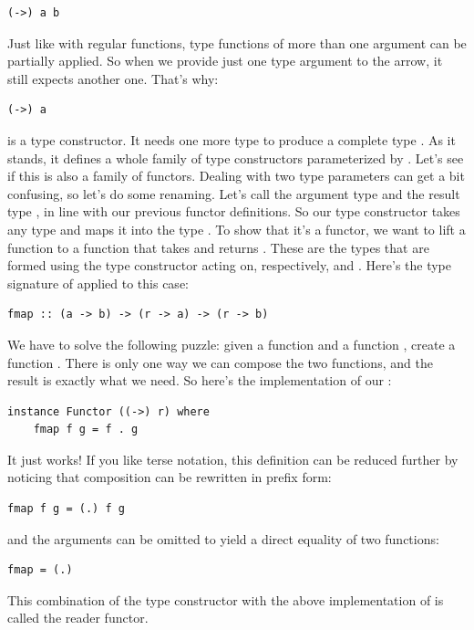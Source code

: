 \begin{verbatim}
(->) a b
\end{verbatim}
Just like with regular functions, type functions of more than one
argument can be partially applied. So when we provide just one type
argument to the arrow, it still expects another one. That's why:

\begin{verbatim}
(->) a
\end{verbatim}
is a type constructor. It needs one more type  to produce a
complete type . As it stands, it defines a
whole family of type constructors parameterized by . Let's see
if this is also a family of functors. Dealing with two type parameters
can get a bit confusing, so let's do some renaming. Let's call the
argument type  and the result type , in line with
our previous functor definitions. So our type constructor takes any type
 and maps it into the type . To show
that it's a functor, we want to lift a function
 to a function that takes
 and returns . These
are the types that are formed using the type constructor
 acting on, respectively,  and
. Here's the type signature of  applied to this
case:

\begin{verbatim}
fmap :: (a -> b) -> (r -> a) -> (r -> b)
\end{verbatim}
We have to solve the following puzzle: given a function
 and a function
, create a function
. There is only one way we can compose the two
functions, and the result is exactly what we need. So here's the
implementation of our :

\begin{verbatim}
instance Functor ((->) r) where
    fmap f g = f . g
\end{verbatim}
It just works! If you like terse notation, this definition can be
reduced further by noticing that composition can be rewritten in prefix
form:

\begin{verbatim}
fmap f g = (.) f g
\end{verbatim}
and the arguments can be omitted to yield a direct equality of two
functions:

\begin{verbatim}
fmap = (.)
\end{verbatim}
This combination of the type constructor 
with the above implementation of  is called the reader
functor.

